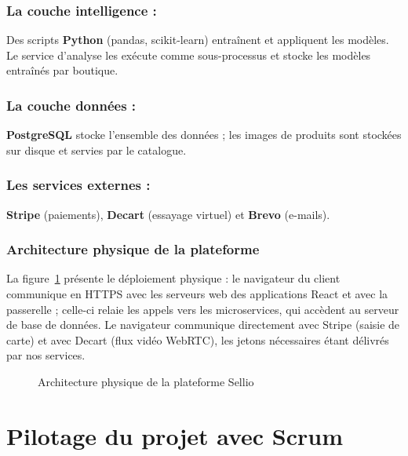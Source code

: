 \subsubsection*{La couche intelligence :}
Des scripts \textbf{Python} (pandas, scikit-learn) entraînent et appliquent les modèles. Le service d'analyse les exécute comme sous-processus et stocke les modèles entraînés par boutique.

\subsubsection*{La couche données :}
\textbf{PostgreSQL} stocke l'ensemble des données ; les images de produits sont stockées sur disque et servies par le catalogue.

\subsubsection*{Les services externes :}
\textbf{Stripe} (paiements), \textbf{Decart} (essayage virtuel) et \textbf{Brevo} (e-mails).

\subsubsection{Architecture physique de la plateforme}
La figure~\ref{fig:archi_physique} présente le déploiement physique : le navigateur du client communique en HTTPS avec les serveurs web des applications React et avec la passerelle ; celle-ci relaie les appels vers les microservices, qui accèdent au serveur de base de données. Le navigateur communique directement avec Stripe (saisie de carte) et avec Decart (flux vidéo WebRTC), les jetons nécessaires étant délivrés par nos services.
\begin{figure}[H]
    \centering
    \caption{Architecture physique de la plateforme Sellio}
    \label{fig:archi_physique}
\end{figure}

\section{Pilotage du projet avec Scrum}

